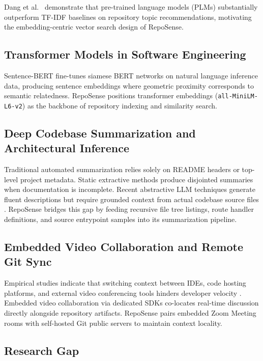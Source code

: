 \documentclass[journal]{IEEEtran}
\begin{document}
Dang et al.\ \cite{dang2024legion} demonstrate that pre-trained language models (PLMs) substantially outperform TF-IDF baselines on repository topic recommendations, motivating the embedding-centric vector search design of RepoSense.

\subsection{Transformer Models in Software Engineering}

Sentence-BERT \cite{reimers2019sbert} fine-tunes siamese BERT networks on natural language inference data, producing sentence embeddings where geometric proximity corresponds to semantic relatedness. RepoSense positions transformer embeddings (\texttt{all-MiniLM-L6-v2}) as the backbone of repository indexing and similarity search.

\subsection{Deep Codebase Summarization and Architectural Inference}

Traditional automated summarization relies solely on README headers or top-level project metadata. Static extractive methods produce disjointed summaries when documentation is incomplete. Recent abstractive LLM techniques generate fluent descriptions but require grounded context from actual codebase source files \cite{openai_gpt4}. RepoSense bridges this gap by feeding recursive file tree listings, route handler definitions, and source entrypoint samples into its summarization pipeline.

\subsection{Embedded Video Collaboration and Remote Git Sync}

Empirical studies indicate that switching context between IDEs, code hosting platforms, and external video conferencing tools hinders developer velocity \cite{zoom_sdk}. Embedded video collaboration via dedicated SDKs co-locates real-time discussion directly alongside repository artifacts. RepoSense pairs embedded Zoom Meeting rooms with self-hosted Git public servers to maintain context locality.

\subsection{Research Gap}
\end{document}
